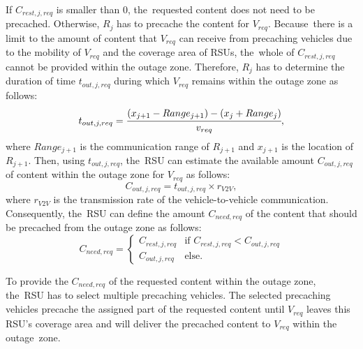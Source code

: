 \documentclass[electronics,aricle,accept,pdftex,moreauthors]{Definitions/mdpi}
\begin{document}
If $C_{rest,j,req}$ is smaller than 0, the~requested content does not need to be precached.
Otherwise, $R_{j}$ has to precache the content for $V_{req}$. Because~there is a limit to the amount of content that $V_{req}$ can receive from precaching vehicles due to the mobility of $V_{req}$ and the coverage area of RSUs, the~whole of $C_{rest,j,req}$ cannot be provided within the outage zone.
Therefore, $R_{j}$ has to determine the duration of time $t_{out,j,req}$ during which $V_{req}$ remains within the outage zone as follows:
\begin{equation}
    t_{out,j,req} = \cfrac{(x_{j+1}-Range_{j+1})-(x_{j}+Range_{j})}{v_{req}},
\end{equation}
where $Range_{j+1}$ is the communication range of $R_{j+1}$ and $x_{j+1}$ is the location of $R_{j+1}$.
Then, using $t_{out,j,req}$, the~RSU can estimate the available amount $C_{out,j,req}$ of content within the outage zone for $V_{req}$ as follows:
\begin{equation}
    C_{out,j,req} = t_{out,j,req} \times r_{V2V},
\end{equation}
where $r_{V2V}$ is the transmission rate of the vehicle-to-vehicle communication.
Consequently, the~RSU can define the amount $C_{need,req}$ of the content that should be precached from the outage zone as follows:
\begin{equation}
    C_{need,req}=\begin{cases}
        C_{rest,j,req} & \text{if } C_{rest,j,req} < C_{out,j,req} \\
        C_{out,j,req} & \text{else.}
    \end{cases}
\end{equation}

To provide the $C_{need,req}$ of the requested content within the outage zone, the~RSU has to select multiple precaching vehicles.
The selected precaching vehicles precache the assigned part of the requested content until $V_{req}$ leaves this RSU's coverage area and will deliver the precached content to $V_{req}$ within the outage~zone.
\end{document}
